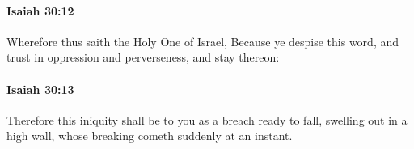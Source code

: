 		\paragraph{Isaiah 30:12} %
			\label{ISAIAH-30-12}

			Wherefore thus saith the Holy One of Israel, Because ye despise this word, and trust in oppression and perverseness, and stay thereon:


		\paragraph{Isaiah 30:13} %
			\label{ISAIAH-30-13}

			Therefore this iniquity shall be to you as a breach ready to fall, swelling out in a high wall, whose breaking cometh suddenly at an instant.


